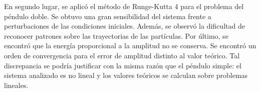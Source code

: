 \documentclass[aps,prb,twocolumn,superscriptaddress,floatfix,longbibliography,10pt]{revtex4-2}
\newcounter{para}
\begin{document}
En segundo lugar, se aplicó el método de Runge-Kutta 4 para el problema del péndulo doble. Se obtuvo una gran sensibilidad del sistema frente a perturbaciones de las condiciones iniciales. Además, se observó la dificultad de reconocer patrones sobre las trayectorias de las partículas. Por último, se encontró que la energía proporcional a la amplitud no se conserva. Se encontró un orden de convergencia para el error de amplitud distinto al valor teórico. Tal discrepancia se podría justificar con la misma razón que el péndulo simple: el sistema analizado es no lineal y los valores teóricos se calculan sobre problemas lineales.



\end{document}
